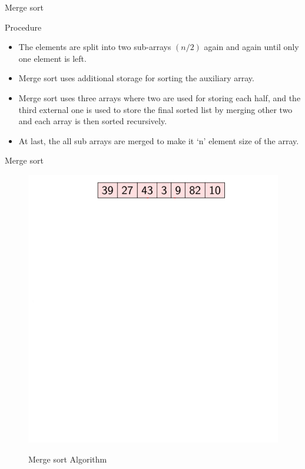 \documentclass{beamer}
\begin{document}
\begin{frame}{Merge sort}  
	     \begin{block}{Procedure}
	    	\begin{itemize}
	    	\item<2->The elements are split into two sub-arrays $(n/2)$ again and again until only one element is left.
	    	\item<3-> Merge sort uses additional storage for sorting the auxiliary array.
	    	\item<4->  Merge sort uses three arrays where two are used for storing each half, and the third external one is used to store the final sorted list by merging other two and each array is then sorted recursively.
	    	\item<5->  At last, the all sub arrays are merged to make it ‘n’ element size of the array. 
	    	\end{itemize}
	    \end{block}
\end{frame}

\begin{frame}{Merge sort}
	\begin{figure}[h]
		\centering
		\includegraphics[scale=0.24]{IKEHS1.jpg}
		\label{fig:2}
		\caption{Merge sort Algorithm}
	\end{figure}
\end{frame}
\end{document}
